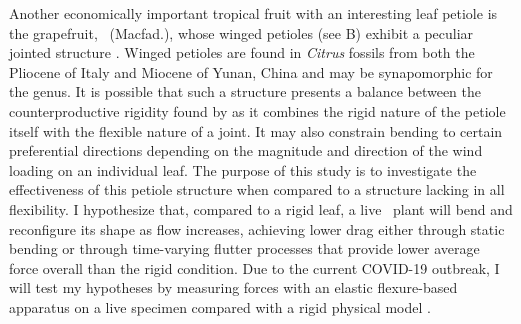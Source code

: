 Another economically important tropical fruit with an interesting leaf petiole is the grapefruit, \Citrusxparadisi\ (Macfad.), whose winged petioles (see B) exhibit a peculiar jointed structure \citep{morton1987grapefruit, kumamoto1987mystery, macfayden1837flora}. Winged petioles are found in \emph{Citrus} fossils from both the Pliocene of Italy \citep{fischer1998citrus} and Miocene of Yunan, China \citep{xie2013citrus} and may be synapomorphic for the genus. It is possible that such a structure presents a balance between the counterproductive rigidity found by \citet{miller2012reconfiguration} as it combines the rigid nature of the petiole itself with the flexible nature of a joint. It may also constrain bending to certain preferential directions depending on the magnitude and direction of the wind loading on an individual leaf. The purpose of this study is to investigate the effectiveness of this petiole structure when compared to a structure lacking in all flexibility. I hypothesize that, compared to a rigid leaf, a live \Cxparadisi\ plant will bend and reconfigure its shape as flow increases, achieving lower drag either through static bending or through time-varying flutter processes that provide lower average force overall than the rigid condition. Due to the current COVID-19 outbreak, I will test my hypotheses by measuring forces with an elastic flexure-based apparatus \citep{denny1983simple, bell1984quantifying} on a live specimen compared with a rigid physical model \citep{stevenson2015when, evangelista2014shifts, stewart2006hydrodynamic, vogel2009leaves}. 

